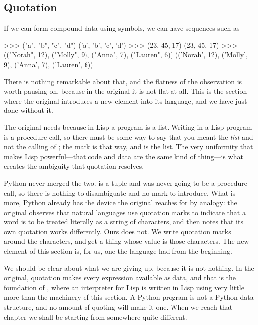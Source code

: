 \subsection{Quotation}
\label{Section 2.3.1}

If we can form compound data using symbols, we can have sequences such as

\begin{codeBlock}
>>> ("a", "b", "c", "d")
('a', 'b', 'c', 'd')
>>> (23, 45, 17)
(23, 45, 17)
>>> (("Norah", 12), ("Molly", 9), ("Anna", 7), ("Lauren", 6))
(('Norah', 12), ('Molly', 9), ('Anna', 7), ('Lauren', 6))
\end{codeBlock}

\noindent
There is nothing remarkable about that, and the flatness of the observation is
worth pausing on, because in the original it is not flat at all.  This is the
section where the original introduces a new element into its language, and we
have just done without it.

\begin{buildFromScarcity}
The original needs  because in Lisp a program is a list.
Writing  in a Lisp program is a procedure call, so there must be
some way to say that you meant the \emph{list}  and not the
calling of ; the mark  is that way, and  is the
list.  The very uniformity that makes Lisp powerful---that code and data are
the same kind of thing---is what creates the ambiguity that quotation resolves.

Python never merged the two.   is a tuple and was never
going to be a procedure call, so there is nothing to disambiguate and no mark
to introduce.  What is more, Python already has the device the original reaches
for by analogy: the original observes that natural languages use quotation
marks to indicate that a word is to be treated literally as a string of
characters, and then notes that its own quotation works differently.  Ours does
not.  We write quotation marks around the characters, and get a thing whose
value is those characters.  The new element of this section is, for us, one the
language had from the beginning.

We should be clear about what we are giving up, because it is not nothing.  In
the original, quotation makes every expression available as data, and that is
the foundation of , where an interpreter for Lisp is written in
Lisp using very little more than the machinery of this section.  A Python
program is not a Python data structure, and no amount of quoting will make it
one.  When we reach that chapter we shall be starting from somewhere quite
different.
\end{buildFromScarcity}

